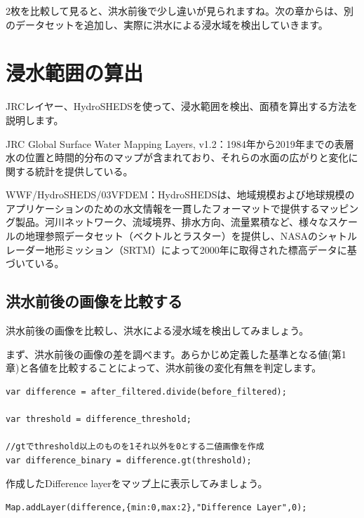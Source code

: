 \documentclass[
]{book}
\begin{document}
2枚を比較して見ると、洪水前後で少し違いが見られますね。次の章からは、別のデータセットを追加し、実際に洪水による浸水域を検出していきます。

\hypertarget{ux6d78ux6c34ux7bc4ux56f2ux306eux7b97ux51fa}{%
\chapter{浸水範囲の算出}\label{ux6d78ux6c34ux7bc4ux56f2ux306eux7b97ux51fa}}

JRCレイヤー、HydroSHEDSを使って、浸水範囲を検出、面積を算出する方法を説明します。

JRC Global Surface Water Mapping Layers, v1.2：1984年から2019年までの表層水の位置と時間的分布のマップが含まれており、それらの水面の広がりと変化に関する統計を提供している。

WWF/HydroSHEDS/03VFDEM：HydroSHEDSは、地域規模および地球規模のアプリケーションのための水文情報を一貫したフォーマットで提供するマッピング製品。河川ネットワーク、流域境界、排水方向、流量累積など、様々なスケールの地理参照データセット（ベクトルとラスター）を提供し、NASAのシャトルレーダー地形ミッション（SRTM）によって2000年に取得された標高データに基づいている。

\hypertarget{ux6d2aux6c34ux524dux5f8cux306eux753bux50cfux3092ux6bd4ux8f03ux3059ux308b}{%
\section{洪水前後の画像を比較する　　}\label{ux6d2aux6c34ux524dux5f8cux306eux753bux50cfux3092ux6bd4ux8f03ux3059ux308b}}

洪水前後の画像を比較し、洪水による浸水域を検出してみましょう。

まず、洪水前後の画像の差を調べます。あらかじめ定義した基準となる値(第1章)と各値を比較することによって、洪水前後の変化有無を判定します。

\begin{verbatim}
var difference = after_filtered.divide(before_filtered);

var threshold = difference_threshold;

//gtでthreshold以上のものを1それ以外を0とする二値画像を作成
var difference_binary = difference.gt(threshold); 
\end{verbatim}

作成したDifference layerをマップ上に表示してみましょう。

\begin{verbatim}
Map.addLayer(difference,{min:0,max:2},"Difference Layer",0);
\end{verbatim}
\end{document}
